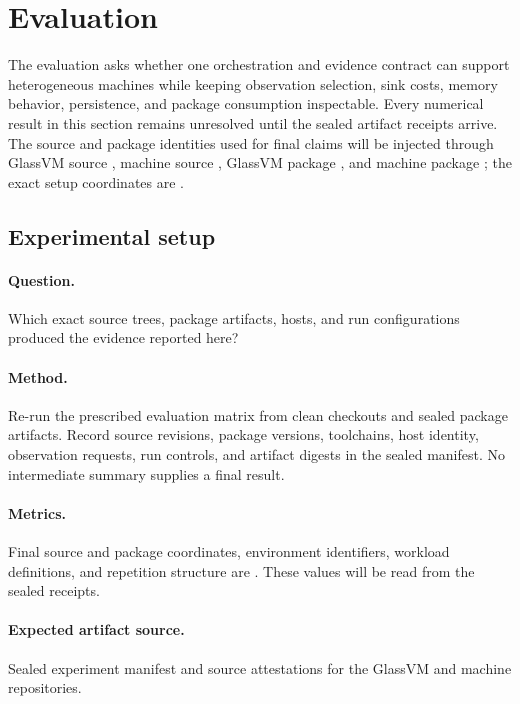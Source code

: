 \section{Evaluation}

The evaluation asks whether one orchestration and evidence contract can
support heterogeneous machines while keeping observation selection, sink
costs, memory behavior, persistence, and package consumption inspectable.
Every numerical result in this section remains unresolved until the sealed
artifact receipts arrive. The source and package identities used for final
claims will be injected through GlassVM source \GlassVMSourceSHA, machine
source \MachinesSourceSHA, GlassVM package \GlassVMVersion, and machine
package \MachinesVersion; the exact setup coordinates are
\TBASourceCoordinates.

\subsection{Experimental setup}
\label{sec:setup}

\paragraph{Question.} Which exact source trees, package artifacts, hosts, and
run configurations produced the evidence reported here?

\paragraph{Method.} Re-run the prescribed evaluation matrix from clean
checkouts and sealed package artifacts. Record source revisions, package
versions, toolchains, host identity, observation requests, run controls, and
artifact digests in the sealed manifest. No intermediate summary supplies a
final result.

\paragraph{Metrics.} Final source and package coordinates, environment
identifiers, workload definitions, and repetition structure are
\TBASourceCoordinates. These values will be read from the sealed receipts.

\paragraph{Expected artifact source.} Sealed experiment manifest and source
attestations for the GlassVM and machine repositories.

